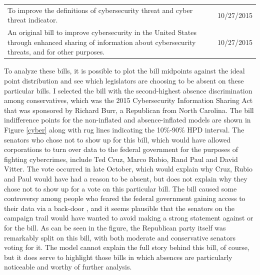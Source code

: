 \begin{table}[h!]
\begin{tabular}{p{6in}l}
		To improve the definitions of cybersecurity threat and cyber threat indicator.                                                                                                                                                           & 10/27/2015 \\
		An original bill to improve cybersecurity in the United States through enhanced sharing of information about cybersecurity threats, and for other purposes.                                                                              & 10/27/2015
	\end{tabular}
\end{table}

To analyze these bills, it is possible to plot the bill midpoints against the ideal point distribution and see which legislators are choosing to be absent on these particular bills. I selected the bill with the second-highest absence discrimination among conservatives, which was the 2015 Cybersecurity Information Sharing Act that was sponsored by Richard Burr, a Republican from North Carolina. The bill indifference points for the non-inflated and absence-inflated models are shown in Figure \ref{cyber} along with rug lines indicating the 10\%-90\% HPD interval. The senators who chose not to show up for this bill, which would have allowed corporations to turn over data to the federal government for the purposes of fighting cybercrimes, include Ted Cruz, Marco Rubio, Rand Paul and David Vitter. The vote occurred in late October, which would explain why Cruz, Rubio and Paul would have had a reason to be absent, but does not explain why they chose not to show up for a vote on this particular bill. The bill caused some controversy among people who feared the federal government gaining access to their data via a back-door \parencite{cisa2015}, and it seems plausible that the senators on the campaign trail would have wanted to avoid making a strong statement against or for the bill. As can be seen in the figure, the Republican party itself was remarkably split on this bill, with both moderate and conservative senators voting for it. The model cannot explain the full story behind this bill, of course, but it does serve to highlight those bills in which absences are particularly noticeable and worthy of further analysis.

